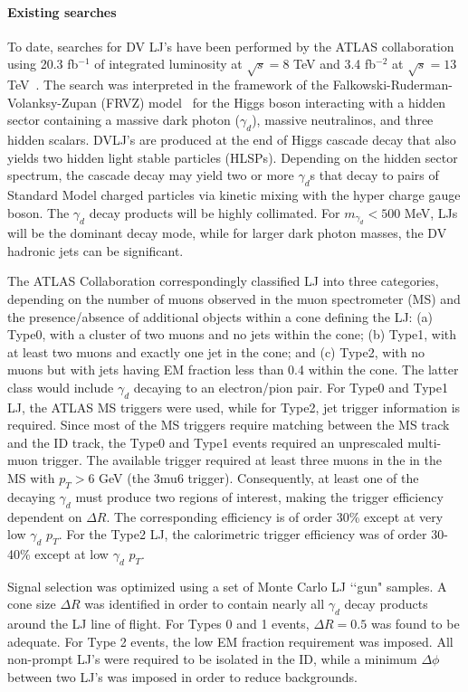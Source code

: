\paragraph {Existing searches} To date, searches for DV LJ's have been performed by the ATLAS collaboration using 20.3 fb$^{-1}$ of integrated luminosity at $\sqrt{s}=8$ TeV \cite{Aad:2014yea} and 3.4 fb$^{-2}$ at  $\sqrt{s}=13$ TeV~\cite{ATLAS:2016jza}. The search was interpreted in the framework of the Falkowski-Ruderman-Volanksy-Zupan (FRVZ) model~\cite{Falkowski:2010cm} for the Higgs boson interacting with a hidden sector containing a massive dark photon ($\gamma_d$), massive neutralinos, and three hidden scalars. DVLJ's are produced at the end of Higgs cascade decay that also yields two hidden light stable particles (HLSPs). Depending on the hidden sector spectrum, the cascade decay may yield two or more $\gamma_d$s that decay to pairs of Standard Model charged particles via kinetic mixing with the hyper charge gauge boson. The $\gamma_d$ decay products will be highly collimated. For $m_{\gamma_d} < 500$ MeV, LJs will be the dominant decay mode, while for larger dark photon masses, the DV hadronic jets can be significant.

The ATLAS Collaboration correspondingly classified LJ into three categories, depending on the number of muons observed in the muon spectrometer (MS) and the presence/absence of additional objects within a cone defining the LJ: (a) Type0, with a cluster of two muons and no jets within the cone; (b) Type1, with at least two muons and exactly one jet in the cone; and (c) Type2, with no muons but with jets having EM fraction less than 0.4 within the cone. The latter class would include $\gamma_d$ decaying to an electron/pion pair. For Type0 and Type1 LJ,  the ATLAS MS triggers were used, while for Type2, jet trigger information is required. Since most of the MS triggers require matching between the MS track and the ID track, the Type0 and Type1 events required an unprescaled multi-muon trigger. The available trigger required at least three muons in the in the MS with $p_T> 6$ GeV (the 3mu6 trigger). Consequently, at least one of the decaying $\gamma_d$ must produce two regions of interest, making the trigger efficiency dependent on $\Delta R$. The corresponding efficiency is of order 30\% except at very low $\gamma_d$ $p_T$. For the Type2 LJ, the calorimetric trigger efficiency was of order 30-40\% except at low $\gamma_d$ $p_T$.

Signal selection was optimized using a set of Monte Carlo LJ \lq\lq gun" samples. A cone size $\Delta R$ was identified in order to contain nearly all $\gamma_d$ decay products around the LJ line of flight. For Types 0 and 1 events, $\Delta R=0.5$ was found to be adequate. For Type 2 events, the low EM fraction requirement was imposed. All non-prompt LJ's were required to be isolated in the ID, while a minimum $\Delta\phi$ between two LJ's was imposed in order to reduce backgrounds. 

